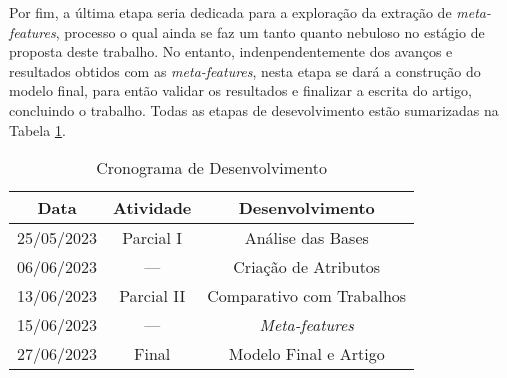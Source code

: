 \documentclass[manuscript,screen,review]{acmart}
\begin{document}
Por fim, a última etapa seria dedicada para a exploração da extração de \emph{meta-features}, processo o qual ainda se faz um tanto quanto nebuloso no estágio de proposta deste trabalho. No entanto, indenpendentemente dos avanços e resultados obtidos com as \emph{meta-features}, nesta etapa se dará a construção do modelo final, para então validar os resultados e finalizar a escrita do artigo, concluindo o trabalho. Todas as etapas de desevolvimento estão sumarizadas na Tabela \ref{tab:exampleTab1}.

\begin{table}[H]
    \centering
    \caption{Cronograma de Desenvolvimento}
    \label{tab:exampleTab1}
    \begin{tabular}{c|c|c}
        \hline
        \textbf{Data} & \textbf{Atividade} & \textbf{Desenvolvimento}\\
        \hline
        25/05/2023 & Parcial I & Análise das Bases\\
        06/06/2023 & --- & Criação de Atributos\\
        13/06/2023 & Parcial II & Comparativo com Trabalhos\\
        15/06/2023 & --- & \emph{Meta-features}\\
        27/06/2023 & Final & Modelo Final e Artigo\\
        \hline
    \end{tabular}
\end{table}



\end{document}
